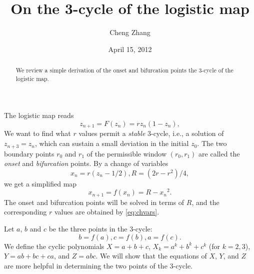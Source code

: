\documentclass[twocolumn,prl]{revtex4-1}
\begin{document}
\title{On the 3-cycle of the logistic map}
\author{Cheng Zhang}
\date{April 15, 2012}
\begin{abstract}
We review a simple derivation of 
  the onset and bifurcation points the 3-cycle
  of the logistic map.
\end{abstract}
\maketitle


The logistic map reads
\[
  z_{n+1} = F(z_n) = r z_n (1 - z_n),
\]
We want to find what $r$ values permit a \emph{stable} 3-cycle,
i.e., a solution of $z_{n+3} = z_n$,
which can sustain a small deviation in the initial $z_0$.
The two boundary points $r_0$ and $r_1$ 
  of the permissible window $(r_0, r_1)$
  are called the \emph{onset} and \emph{bifurcation} points.
%
By a change of variables
\begin{equation}
  x_n = r (z_n - 1/2),
  R = (2 r - r^2)/4,
\label{eq:chvars}
\end{equation}
we get a simplified map
\[
x_{n+1} = f(x_n) = R - {x_n}^2.
\]
The onset and bifurcation points will be solved
  in terms of $R$, and the corresponding $r$ values 
  are obtained by \eqref{eq:chvars}.


Let $a$, $b$ and $c$ be the three points in the 3-cycle:
\begin{equation}
  b=f(a), c=f(b), a=f(c).
\label{eq:abc}
\end{equation}
We define the cyclic polynomials
$X = a+b+c$,
$X_k = a^k+b^k+c^k$ (for $k = 2,3$),
$Y = ab+bc+ca$, and $Z = abc$.
We will show that the equations of $X$, $Y$, and $Z$
are more helpful in determining the two points of the 3-cycle.



\end{document}
